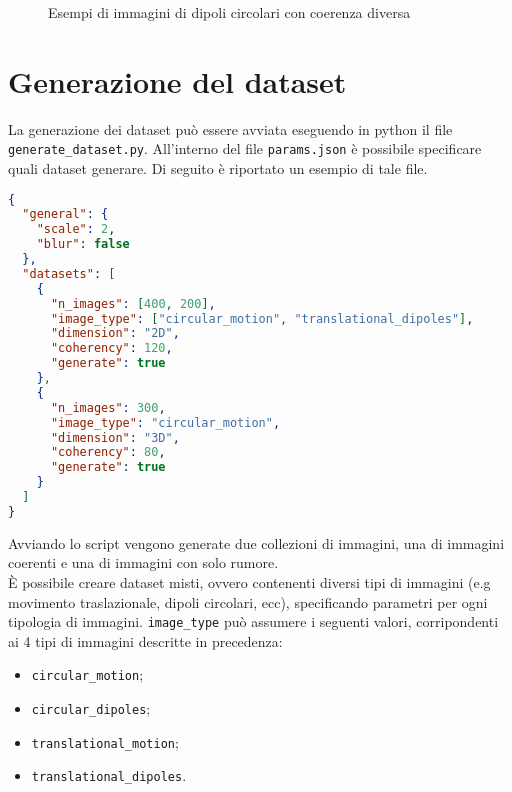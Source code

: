 \begin{figure}[ht]
	\hfill
	\hfill
	\hfill
	\hfill
	\caption{Esempi di immagini di dipoli circolari con coerenza diversa}
	\label{fig:coherencyex}
\end{figure}


\section{Generazione del dataset}

La generazione dei dataset può essere avviata eseguendo in python il file \\\texttt{generate\_dataset.py}. All'interno del file \texttt{params.json} è possibile specificare quali dataset generare. Di seguito è riportato un esempio di tale file. 

\begin{lstlisting}[language=json,firstnumber=1, label={list:jsondataset}, caption={Esempio di configurazione del \textit{json} per la generazione di due dataset},captionpos=b]
{
  "general": {
    "scale": 2,
    "blur": false
  },
  "datasets": [
    {
      "n_images": [400, 200],
      "image_type": ["circular_motion", "translational_dipoles"],
      "dimension": "2D",
      "coherency": 120,
      "generate": true
    },
    {
      "n_images": 300,
      "image_type": "circular_motion",
      "dimension": "3D",
      "coherency": 80,
      "generate": true
    }
  ]
}
\end{lstlisting}

Avviando lo script vengono generate due collezioni di immagini, una di immagini coerenti e una di immagini con solo rumore.\\
È possibile creare dataset misti, ovvero contenenti diversi tipi di immagini (e.g movimento traslazionale, dipoli circolari, ecc), specificando parametri per ogni tipologia di immagini. \texttt{image\_type} può assumere i seguenti valori, corripondenti ai 4 tipi di immagini descritte in precedenza:
\begin{itemize}
	\item \texttt{circular\_motion};
	\item \texttt{circular\_dipoles};
	\item \texttt{translational\_motion};
	\item \texttt{translational\_dipoles}.
\end{itemize}

